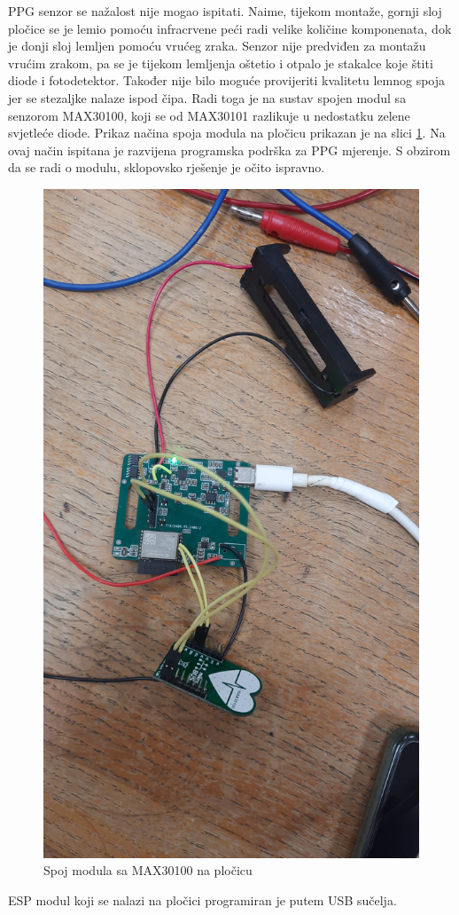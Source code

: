 PPG senzor se nažalost nije mogao ispitati. Naime, tijekom montaže, gornji sloj pločice se je lemio pomoću infracrvene peći radi velike količine komponenata, dok je donji sloj lemljen pomoću vrućeg zraka. Senzor nije predviđen za montažu vrućim zrakom, pa se je tijekom lemljenja oštetio i otpalo je stakalce koje štiti diode i fotodetektor. Također nije bilo moguće provijeriti kvalitetu lemnog spoja jer se stezaljke nalaze ispod čipa. Radi toga je na sustav spojen modul sa senzorom MAX30100, koji se od MAX30101 razlikuje u nedostatku zelene svjetleće diode. Prikaz načina spoja modula na pločicu prikazan je na slici \ref{slk:BR_TEST_05}. Na ovaj način ispitana je razvijena programska podrška za PPG mjerenje. S obzirom da se radi o modulu, sklopovsko rješenje je očito ispravno.
\begin{figure}
    \centering
    \includegraphics[width=10 cm]{Figures/BR_TEST_05.jpg}
    \caption{Spoj modula sa MAX30100 na pločicu}
    \label{slk:BR_TEST_05}
\end{figure}

ESP modul koji se nalazi na pločici programiran je putem USB sučelja.